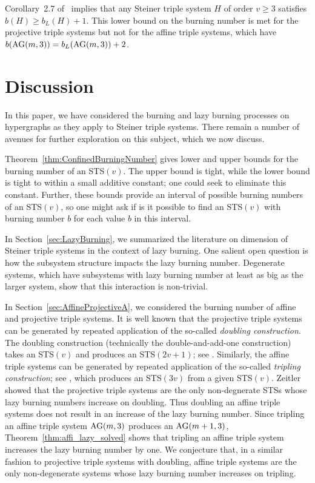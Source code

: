 \documentclass[12pt]{article}
\DeclareMathOperator{\AG}{\rm AG}
\theoremstyle{definition}
\numberwithin{table}{section}
\begin{document}
Corollary~2.7 of~\cite{introducing_hyp_burn} implies that any Steiner triple system $H$ of order $v \geq 3$ satisfies $b(H) \geq b_L(H)+1$.  This lower bound on the burning number is met for the projective triple systems but not for the affine triple systems, which have $b(\AG(m,3)) = b_L(\AG(m,3))+2$.

\section{Discussion}
\label{sec:Discussion}

In this paper, we have considered the burning and lazy burning processes on hypergraphs as they apply to Steiner triple systems.  There remain a number of avenues for further exploration on this subject, which we now discuss.

Theorem~\ref{thm:ConfinedBurningNumber} gives lower and upper bounds for the burning number of an STS$(v)$. The upper bound is tight, while the lower bound is tight to within a small additive constant; one could seek to eliminate this constant.  Further, these bounds provide an interval of possible burning numbers of an STS$(v)$, so one might ask if is it possible to find an STS$(v)$ with burning number $b$ for each value $b$ in this interval. 

In Section~\ref{sec:LazyBurning}, we summarized the literature on dimension of Steiner triple systems in the context of lazy burning. One salient open question is how the subsystem structure impacts the lazy burning number. Degenerate systems, which have subsystems with lazy burning number at least as big as the larger system, show that this interaction is non-trivial.

In Section~\ref{sec:AffineProjectiveA}, we considered the burning number of affine and projective triple systems. 
It is well known that the projective triple systems can be generated by repeated application of the so-called {\em doubling construction}. The doubling construction (technically the double-and-add-one construction) takes an STS$(v)$ and produces an STS$(2v+1)$; see \cite[Construction 2.15]{designs_handbook}. 
Similarly, the affine triple systems can be generated by repeated application of the so-called {\em tripling construction}; see \cite[Construction 2.17]{designs_handbook}, which produces an STS$(3v)$ from a given STS$(v)$. 
Zeitler~\cite{Zeitler1987} showed that the projective triple systems are the only non-degnerate STSs whose lazy burning numbers increase on doubling. Thus doubling an affine triple systems does not result in an increase of the lazy burning number. 
Since tripling an affine triple system $\AG(m,3)$ produces an $\AG(m+1,3)$, Theorem~\ref{thm:affi_lazy_solved} shows that tripling an affine triple system increases the lazy burning number by one. We conjecture that, in a similar fashion to projective triple systems with doubling, affine triple systems are the only non-degenerate systems whose lazy burning number increases on tripling.
\end{document}
